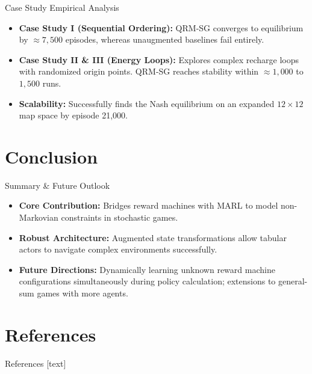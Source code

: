 \documentclass[10pt, aspectratio=169]{beamer}
\begin{document}
\begin{frame}{Case Study Empirical Analysis}
    \begin{itemize}
        \item \textbf{Case Study I (Sequential Ordering):} QRM-SG converges to equilibrium by $\approx 7,500$ episodes, whereas unaugmented baselines fail entirely.
        \item \textbf{Case Study II \& III (Energy Loops):} Explores complex recharge loops with randomized origin points. QRM-SG reaches stability within $\approx 1,000$ to $1,500$ runs.
        \item \textbf{Scalability:} Successfully finds the Nash equilibrium on an expanded $12\times12$ map space by episode 21,000.
    \end{itemize}
\end{frame}

\section{Conclusion}

\begin{frame}{Summary \& Future Outlook}
    \begin{itemize}
        \item \textbf{Core Contribution:} Bridges reward machines with MARL to model non-Markovian constraints in stochastic games.
        \item \textbf{Robust Architecture:} Augmented state transformations allow tabular actors to navigate complex environments successfully.
        \item \textbf{Future Directions:} Dynamically learning unknown reward machine configurations simultaneously during policy calculation; extensions to general-sum games with more agents.
    \end{itemize}
\end{frame}

\section{References}
\begin{frame}[allowframebreaks]{References}
    [text] %
    
\end{frame}
\end{document}
